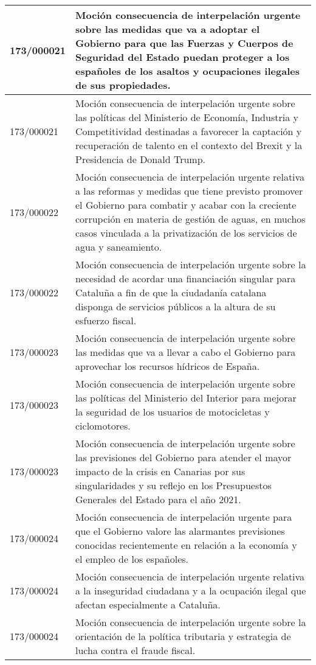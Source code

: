 {\begin{table}[H]
\begin{center}
\begin{tabularx}{\linewidth}{| l | X |}
\hline
173/000021 & Moción consecuencia de interpelación urgente sobre las medidas que va a adoptar el Gobierno para que las Fuerzas y Cuerpos de Seguridad del Estado puedan proteger a los españoles de los asaltos y ocupaciones ilegales de sus propiedades. \\
\hline
173/000021 & Moción consecuencia de interpelación urgente sobre las políticas del Ministerio de Economía, Industria y Competitividad destinadas a favorecer la captación y recuperación de talento en el contexto del Brexit y la Presidencia de Donald Trump. \\
\hline
173/000022 & Moción consecuencia de interpelación urgente relativa a las reformas y medidas que tiene previsto promover el Gobierno para combatir y acabar con la creciente corrupción en materia de gestión de aguas, en muchos casos vinculada a la privatización de los servicios de agua y saneamiento. \\
\hline
173/000022 & Moción consecuencia de interpelación urgente sobre la necesidad de acordar una financiación singular para Cataluña a fin de que la ciudadanía catalana disponga de servicios públicos a la altura de su esfuerzo fiscal. \\
\hline
173/000023 & Moción consecuencia de interpelación urgente sobre las medidas que va a llevar a cabo el Gobierno para aprovechar los recursos hídricos de España. \\
\hline
173/000023 & Moción consecuencia de interpelación urgente sobre las políticas del Ministerio del Interior para mejorar la seguridad de los usuarios de motocicletas y ciclomotores. \\
\hline
173/000023 & Moción consecuencia de interpelación urgente sobre las previsiones del Gobierno para atender el mayor impacto de la crisis en Canarias por sus singularidades y su reflejo en los Presupuestos Generales del Estado para el año 2021. \\
\hline
173/000024 & Moción consecuencia de interpelación urgente para que el Gobierno valore las alarmantes previsiones conocidas recientemente en relación a la economía y el empleo de los españoles. \\
\hline
173/000024 & Moción consecuencia de interpelación urgente relativa a la inseguridad ciudadana y a la ocupación ilegal que afectan especialmente a Cataluña. \\
\hline
173/000024 & Moción consecuencia de interpelación urgente sobre la orientación de la política tributaria y estrategia de lucha contra el fraude fiscal. \\

\end{tabularx}
\end{center}
\end{table}}
